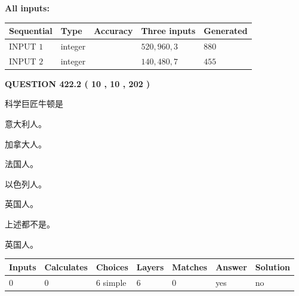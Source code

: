 \documentclass{ctexart}
\begin{document}
   
   
   
\noindent\vspace{0.1in}\hspace{-0.08in} {\textbf{\Large{All inputs: }}}
   
   
  
  
\noindent\begin{tabular}{|l|l|l|l|l|}
\hline
 Sequential & Type & Accuracy & Three inputs & Generated \\ 
\hline
 
 
  INPUT $  1 $ & integer &  & $
 520
 , 
 960
 , 
 3
 $ & $ 880 $ 
 \\  \hline  
 
 
  INPUT $  2 $ & integer &  & $
 140
 , 
 480
 , 
 7
 $ & $ 455 $ 
 \\  \hline  
 \end{tabular}
   
   
  
\vspace{0.2in}
  
{\textbf{\Large{QUESTION
422.2 
 ( 10 , 10 , 202 )
}}}
  
  
科学巨匠牛顿是
 
 
意大利人。
 
 
加拿大人。
 
 
法国人。
 
 
以色列人。
 
 
英国人。
 
 
 上述都不是。
 
 
\noindent{}
 
 
英国人。
 
 
\noindent{}
 
 
   
   
   
   
\noindent\begin{tabular}{|l|l|l|l|l|l|l|}
 \hline
Inputs & Calculates & Choices & Layers & Matches & Answer & Solution \\ \hline
 0  & 
 0  & 
 6
  simple  
  & 
 6  & 
 0  & 
  yes & 
  no 
  \\ \hline
 \end{tabular}
   
\end{document}
